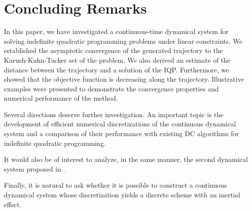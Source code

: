 \documentclass[11pt]{article}
\theoremstyle{definition}
\theoremstyle{remark}
\begin{document}
\section{Concluding Remarks}\label{Sect-5}
In this paper, we have investigated a continuous-time dynamical system for solving indefinite quadratic programming problems under linear constraints. We established the asymptotic convergence of the generated trajectory to the Karush-Kuhn-Tucker set of the problem. We also derived an estimate of the distance between the trajectory and a solution of the IQP. Furthermore, we showed that the objective function is decreasing along the trajectory. Illustrative examples were presented to demonstrate the convergence properties and numerical performance of the method.

Several directions deserve further investigation. An important topic is the development of efficient numerical discretizations of the continuous dynamical system and a comparison of their performance with existing DC algorithms for indefinite quadratic programming.

It would also be of interest to analyze, in the same manner, the second dynamical system proposed in~\cite{pty_2025}.

Finally, it is natural to ask whether it is possible to construct a continuous dynamical system whose discretization yields a discrete scheme with an inertial effect.
\end{document}
